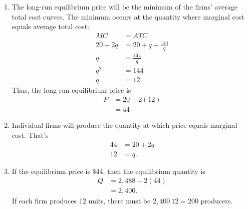 \documentclass{article}
\begin{document}
\begin{enumerate}
\begin{enumerate}
	\item The long-run equilibrium price will be the minimum of the firms' average total cost curves. The minimum occurs at the quantity where marginal cost equals average total cost:
		\begin{align*}
		MC &= ATC \\
		20 + 2q &= 20 + q + \frac{144}{q} \\
		q &= \frac{144}{q} \\
		q^2 &= 144 \\
		q &= 12
		\end{align*}
		Thus, the long-run equilibrium price is
		\begin{align*}
		P &= 20 + 2(12) \\
		&= 44
		\end{align*}
		
	\item Individual firms will produce the quantity at which price equals marginal cost. That's
		\begin{align*}
		44 &= 20 + 2q \\
		12 &= q.
		\end{align*}
		
	\item If the equilibrium price is \$44, then the equilibrium quantity is
		\begin{align*}
		Q &= 2,488 - 2(44) \\
		&= 2,400.
		\end{align*}
		If each firm produces 12 units, there must be $2,400 \ 12 = 200$ producers.

	\end{enumerate}

\end{enumerate}
\end{document}
